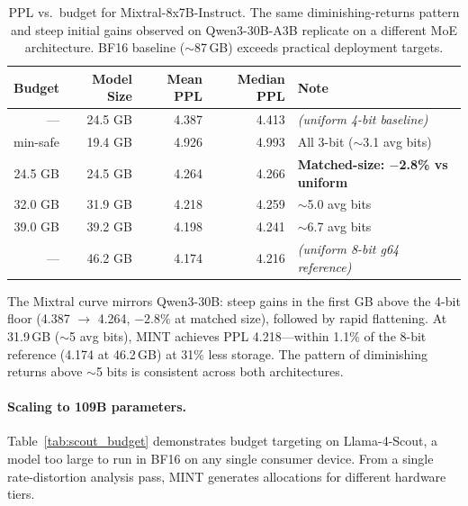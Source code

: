 \documentclass{article}
\begin{document}
\begin{table}[h]
\centering
\caption{PPL vs.\ budget for Mixtral-8x7B-Instruct. The same diminishing-returns pattern and steep initial gains observed on Qwen3-30B-A3B replicate on a different MoE architecture. BF16 baseline (${\sim}$87\,GB) exceeds practical deployment targets.}
\label{tab:mixtral_budget}
\begin{tabular}{rrrrl}
\toprule
Budget & Model Size & Mean PPL & Median PPL & Note \\
\midrule
--- & 24.5 GB & 4.387 & 4.413 & \emph{(uniform 4-bit baseline)} \\
min-safe & 19.4 GB & 4.926 & 4.993 & All 3-bit (${\sim}$3.1 avg bits) \\
24.5 GB & 24.5 GB & 4.264 & 4.266 & \textbf{Matched-size: $-$2.8\% vs uniform} \\
32.0 GB & 31.9 GB & 4.218 & 4.259 & ${\sim}$5.0 avg bits \\
39.0 GB & 39.2 GB & 4.198 & 4.241 & ${\sim}$6.7 avg bits \\
--- & 46.2 GB & 4.174 & 4.216 & \emph{(uniform 8-bit g64 reference)} \\
\bottomrule
\end{tabular}
\end{table}

The Mixtral curve mirrors Qwen3-30B: steep gains in the first GB above the 4-bit floor (4.387 $\rightarrow$ 4.264, $-2.8\%$ at matched size), followed by rapid flattening. At 31.9\,GB (${\sim}$5 avg bits), MINT achieves PPL 4.218---within 1.1\% of the 8-bit reference (4.174 at 46.2\,GB) at 31\% less storage. The pattern of diminishing returns above ${\sim}$5 bits is consistent across both architectures.

\paragraph{Scaling to 109B parameters.} Table~\ref{tab:scout_budget} demonstrates budget targeting on Llama-4-Scout, a model too large to run in BF16 on any single consumer device. From a single rate-distortion analysis pass, MINT generates allocations for different hardware tiers.
\end{document}
